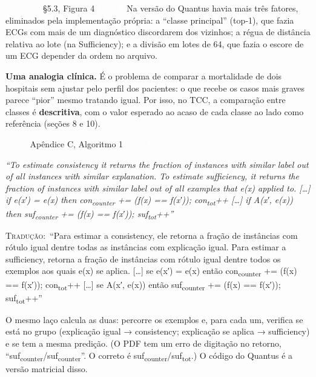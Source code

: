 \documentclass[11pt,a4paper]{article}
\newcommand{\metrictag}[2]{{\setlength{\fboxsep}{1.5pt}%
  \ifstrequal{#1}{c}{\colorbox{cC}{\textcolor{white}{\scriptsize\textbf{#2}}}}{%
  \ifstrequal{#1}{s}{\colorbox{cS}{\textcolor{white}{\scriptsize\textbf{#2}}}}{%
  \colorbox{black!60}{\textcolor{white}{\scriptsize\textbf{#2}}}}}}}
\newcommand{\pagechip}[1]{{\setlength{\fboxsep}{1.5pt}\colorbox{cAcc}{\textcolor{white}{\scriptsize\texttt{#1}}}}}
\newenvironment{origquote}{\par\itshape\small}{\par}
\newenvironment{tradquote}{\par\small\textsc{Tradução:}\ }{\par}
\newcommand{\explab}[1]{\par\smallskip{\small\color{cAcc}\textbf{\MakeUppercase{#1}}}\par}
\begin{document}
\begin{citacard}{\pagechip{p. 15–16} §5.3, Figura 4 \metrictag{cs}{C + S}}
Na versão do Quantus havia mais três fatores, eliminados pela implementação própria: a “classe principal” (top‑1), que fazia ECGs com mais de um diagnóstico discordarem dos vizinhos; a régua de distância relativa ao lote (na Sufficiency); e a divisão em lotes de 64, que fazia o escore de um ECG depender da ordem no arquivo.

\textbf{Uma analogia clínica.} É o problema de comparar a mortalidade de dois hospitais sem ajustar pelo perfil dos pacientes: o que recebe os casos mais graves parece “pior” mesmo tratando igual. Por isso, no TCC, a comparação entre classes é \textbf{descritiva}, com o valor esperado ao acaso de cada classe ao lado como referência (seções 8 e 10).
\end{citacard}

\begin{citacard}{\pagechip{p. 27} Apêndice C, Algoritmo 1 \metrictag{cs}{C + S}}
\begin{origquote}“To estimate consistency it returns the fraction of instances with similar label out of all instances with similar explanation. To estimate sufficiency, it returns the fraction of instances with similar label out of all examples that e(x) applied to. […] if e(x′) = e(x) then con\textsubscript{counter} += (f(x) == f(x′)); con\textsubscript{tot}++ […] if A(x′, e(x)) then suf\textsubscript{counter} += (f(x) == f(x′)); suf\textsubscript{tot}++”\end{origquote}
\begin{tradquote}“Para estimar a consistency, ele retorna a fração de instâncias com rótulo igual dentre todas as instâncias com explicação igual. Para estimar a sufficiency, retorna a fração de instâncias com rótulo igual dentre todos os exemplos aos quais e(x) se aplica. […] se e(x′) = e(x) então con\textsubscript{counter} += (f(x) == f(x′)); con\textsubscript{tot}++ […] se A(x′, e(x)) então suf\textsubscript{counter} += (f(x) == f(x′)); suf\textsubscript{tot}++”\end{tradquote}
\explab{Explicação}
O mesmo laço calcula as duas: percorre os exemplos e, para cada um, verifica se está no grupo (explicação igual → consistency; explicação se aplica → sufficiency) e se tem a mesma predição. (O PDF tem um erro de digitação no retorno, “suf\textsubscript{counter}/suf\textsubscript{counter}”. O correto é suf\textsubscript{counter}/suf\textsubscript{tot}.) O código do Quantus é a versão matricial disso.
\end{citacard}
\end{document}
